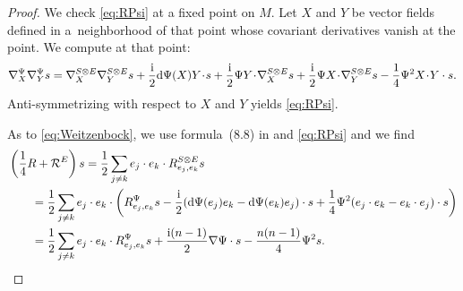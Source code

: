\begin{proof}
We check \eqref{eq:RPsi} at a fixed point on $M$. Let $X$ and $Y$ be vector fields defined in a~neighborhood of that point whose covariant derivatives vanish at the point. We compute at that point:
\begin{align*}
\nabla^\Psi_X \nabla^\Psi_Y s
=
\nabla^{S \otimes E}_X \nabla^{S \otimes E}_Y s + \frac{\rm i}{2} {\rm d}\Psi(X)Y\!\cdot\! s + \frac{\rm i}{2} \Psi Y \!\cdot\! \nabla^{S \otimes E}_X s + \frac{\rm i}{2} \Psi X \!\cdot\! \nabla^{S \otimes E}_Y s
 - \frac{1}{4} \Psi^2 X \!\cdot\! Y\cdot s.
\end{align*}
Anti-symmetrizing with respect to $X$ and $Y$ yields \eqref{eq:RPsi}.

As to \eqref{eq:Weitzenbock}, we use formula~(8.8) in \cite[Chapter~II]{Lawson-Michelsohn} and \eqref{eq:RPsi} and we find
\begin{align*}
&\left(\frac{1}{4} R + \mathcal{R}^E\right)s =
\frac{1}{2} \sum_{j \neq k} e_j\cdot e_k\cdot R^{S \otimes E}_{e_j,e_k} s \\
&\qquad=
\frac{1}{2} \sum_{j \neq k} e_j\cdot e_k\cdot \left( R^\Psi_{e_j,e_k} s - \frac{\rm i}{2} ({\rm d}\Psi(e_j)e_k-{\rm d}\Psi(e_k)e_j) \cdot s + \frac{1}{4} \Psi^2 (e_j\cdot e_k-e_k\cdot e_j) \cdot s \right) \\
&\qquad=
\frac{1}{2} \sum_{j \neq k} e_j\cdot e_k\cdot R^\Psi_{e_j,e_k} s + \frac{{\rm i}(n-1)}{2} \nabla\Psi \cdot s - \frac{n(n-1)}{4} \Psi^2 s.\tag*{\qed}
\end{align*} \renewcommand{\qed}{}
\end{proof}

